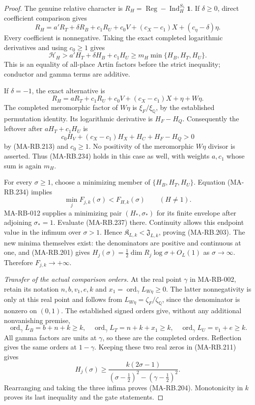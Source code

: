 \begin{proof}
The genuine relative character is
\(R_H=\operatorname{Reg}-\operatorname{Ind}_H^{S_5}\mathbf1\).
If \(\delta\ge0\), direct coefficient comparison gives
\[
 R_H=a'R_T+\delta R_B+c_1R_U+c_0V
                    +(c_X-c_1)X+(c_\eta-\delta)\eta.
 \tag{MA-RB.233}
\]
Every coefficient is nonnegative. Taking the exact completed
logarithmic derivatives and using \(c_0\ge1\) gives
\[
 \mathscr H_H>a'H_T+\delta H_B+c_1H_U
                  \ge m_H\min\{H_B,H_T,H_U\}.
 \tag{MA-RB.234}
\]
This is an equality of all-place Artin factors before the
strict inequality; conductor and gamma terms are additive.

If \(\delta=-1\), the exact alternative is
\[
 R_H=aR_T+c_1R_U+c_0V+(c_X-c_1)X+\eta+W\eta.
 \tag{MA-RB.235}
\]
The completed meromorphic factor of \(W\eta\) is
\(\xi_F/\xi_{\mathbb Q}\), by the established permutation
identity. Its logarithmic derivative is \(H_F-H_Q\).
Consequently the leftover after \(aH_T+c_1H_U\) is
\[
 c_0H_V+(c_X-c_1)H_X+H_C+H_F-H_Q>0
 \tag{MA-RB.236}
\]
by (MA-RB.213) and \(c_0\ge1\).
No positivity of the meromorphic \(W\eta\) divisor is
asserted. Thus (MA-RB.234) holds in this case as well,
with weights \(a,c_1\) whose sum is again \(m_H\).

For every \(\sigma\ge1\), choose a minimizing member of
\(\{H_B,H_T,H_U\}\). Equation (MA-RB.234) implies
\[
       \min_j F_{j,k}(\sigma)<F_{H,k}(\sigma)
                                    \qquad(H\ne1).
 \tag{MA-RB.237}
\]
MA-RB-012 supplies a minimizing pair \((H_*,\sigma_*)\)
for its finite envelope after adjoining \(\sigma_*=1\).
Evaluate (MA-RB.237) there. Continuity allows this endpoint
value in the infimum over \(\sigma>1\). Hence
\(\mathfrak K_{L,k}<\mathfrak J_{L,k}\), proving (MA-RB.203).
The new minima themselves exist: the denominators are positive
and continuous at one, and (MA-RB.201) gives
\(H_j(\sigma)=\tfrac12\dim R_j\log\sigma+O_L(1)\)
as \(\sigma\to\infty\). Therefore \(F_{j,k}\to+\infty\).

\emph{Transfer of the actual comparison orders.}
At the real point \(\gamma\) in MA-RB-002, retain its notation
\(n,b,v_1,e,k\) and
\(x_1=\operatorname{ord}_\gamma L_{W\eta}\ge0\).
The latter nonnegativity is only at this real point and follows
from \(L_{W\eta}=\zeta_F/\zeta_{\mathbb Q}\), since the
denominator is nonzero on \((0,1)\). The established signed
orders give, without any additional nonvanishing premise,
\[
 \operatorname{ord}_\gamma L_B=b+n+k\ge k,\quad
 \operatorname{ord}_\gamma L_T=n+k+x_1\ge k,\quad
 \operatorname{ord}_\gamma L_U=v_1+e\ge k.
 \tag{MA-RB.238}
\]
All gamma factors are units at \(\gamma\), so these are
the completed orders. Reflection gives the same orders at
\(1-\gamma\). Keeping these two real zeros in (MA-RB.211)
gives
\[
 H_j(\sigma)\ge
     \frac{k(2\sigma-1)}
          {(\sigma-\tfrac12)^2-(\gamma-\tfrac12)^2}.
 \tag{MA-RB.239}
\]
Rearranging and taking the three infima proves (MA-RB.204).
Monotonicity in \(k\) proves its last inequality and the
gate statements.
\end{proof}

